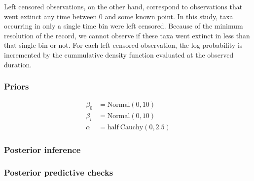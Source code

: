 \documentclass[12pt,letterpaper]{article}
\begin{document}
Left censored observations, on the other hand, correspond to observations that went extinct any time between 0 and some known point. In this study, taxa occurring in only a single time bin were left censored. Because of the minimum resolution of the record, we cannot observe if these taxa went extinct in less than that single bin or not. For each left censored observation, the log probability is incremented by the cummulative density function evaluated at the observed duration.


\subsubsection{Priors}

\begin{align*}
  \beta_{0} &= \mathrm{Normal}(0, 10) \\
  \beta_{i} &= \mathrm{Normal}(0, 10) \\
  \alpha &= \mathrm{half\ Cauchy}(0, 2.5)
\end{align*}


\subsubsection{Posterior inference}


\subsubsection{Posterior predictive checks}
\end{document}
